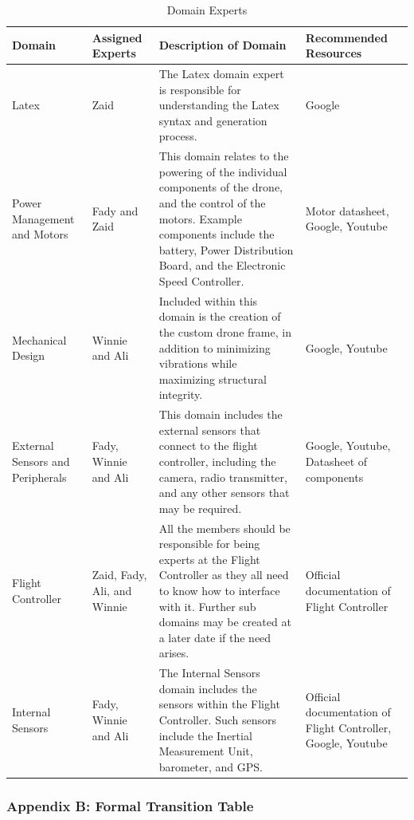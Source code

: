 \documentclass{article}
\begin{document}
\begin{table}[!h]
\begin{center}
\caption {Domain Experts} 
\label{tab:DomainExp}
\begin{tabular}{ | m{2cm} | m{2cm} | m{8cm} | m{2.1cm} | } 
\hline
Domain & Assigned Experts & Description of Domain & Recommended Resources\\
\hline
\hline
Latex & Zaid & The Latex domain expert is responsible for understanding the Latex syntax and generation process. & Google \\
\hline
Power Management and Motors & Fady and Zaid & This domain relates to the powering of the individual components of the drone, and the control of the motors. Example components include the battery, Power Distribution Board, and the Electronic Speed Controller. & Motor datasheet, Google, Youtube \\
\hline
Mechanical Design & Winnie and Ali & Included within this domain is the creation of the custom drone frame, in addition to minimizing vibrations while maximizing structural integrity. & Google, Youtube\\
\hline
External Sensors and Peripherals & Fady, Winnie and Ali & This domain includes the external sensors that connect to the flight controller, including the camera, radio transmitter, and any other sensors that may be required. & Google, Youtube, Datasheet of components \\
\hline
Flight Controller & Zaid, Fady, Ali, and Winnie & All the members should be responsible for being experts at the Flight Controller as they all need to know how to interface with it. Further sub domains may be created at a later date if the need arises. & Official documentation of Flight Controller\\
\hline
Internal Sensors & Fady, Winnie and Ali & The Internal Sensors domain includes the sensors within the Flight Controller. Such sensors include the Inertial Measurement Unit, barometer, and GPS.  & Official documentation of Flight Controller, Google, Youtube \\
\hline
\end{tabular}
\end{center}
\end{table}

\clearpage
\newpage

\subsubsection{Appendix B: Formal Transition Table}
\label{appendixb}
\end{document}
